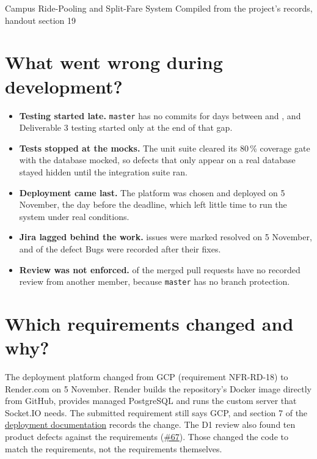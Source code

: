 \documentclass[10pt]{article}
\newcommand{\repourl}{https://github.com/CS455-Carpooling/Campus_Ridepooling_Automation}
\newcommand{\repolink}[2]{\href{\repourl/blob/master/#1}{#2}}
\newcommand{\pr}[1]{\href{\repourl/pull/#1}{\##1}}
\begin{document}
  {Campus Ride-Pooling and Split-Fare System}
  {Compiled from the project's records, handout section 19}

\section{What went wrong during development?}
\begin{itemize}
  \item \textbf{Testing started late.} \texttt{master} has no commits for \CommitGapDays{} days between
    \CommitGapFrom{} and \CommitGapTo{}, and Deliverable 3 testing started only at the end of that gap.
  \item \textbf{Tests stopped at the mocks.} The unit suite cleared its 80\,\% coverage gate with the database
    mocked, so defects that only appear on a real database stayed hidden until the integration suite ran.
  \item \textbf{Deployment came last.} The platform was chosen and deployed on 5 November, the day before the
    deadline, which left little time to run the system under real conditions.
  \item \textbf{Jira lagged behind the work.} \JiraResolvedFinalDay{} issues were marked resolved on 5 November,
    and \JiraDefectBugsFinalDay{} of the \JiraDefectBugs{} defect Bugs were recorded after their fixes.
  \item \textbf{Review was not enforced.} \PullsNoReview{} of the \PullsMerged{} merged pull requests have no
    recorded review from another member, because \texttt{master} has no branch protection.
\end{itemize}

\section{Which requirements changed and why?}
The deployment platform changed from GCP (requirement NFR-RD-18) to Render.com on 5 November. Render builds the
repository's Docker image directly from GitHub, provides managed PostgreSQL and runs the custom server that
Socket.IO needs. The submitted requirement still says GCP, and section 7 of the
\repolink{Deliverables/D3/Deployment_Documentation.md}{deployment documentation} records the change. The D1
review also found ten product defects against the requirements (\pr{67}). Those changed the code to match the
requirements, not the requirements themselves.
\end{document}
